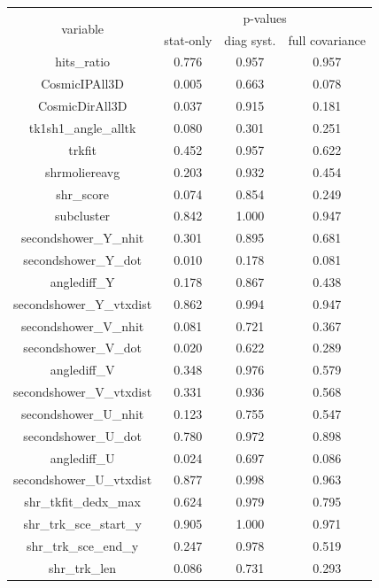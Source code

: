 \begin{table}[H]
\centering
\setlength{\tabcolsep}{10pt}
\renewcommand{\arraystretch}{1.25}
\begin{tabular}{| c | c | c | c | } 
 \hline
\multirow{2}{*}{variable} & \multicolumn{3}{c|}{p-values} \\
\cline{2-4} & stat-only & diag syst. & full covariance \\ \hline
hits\_ratio & 0.776 & 0.957 & 0.957 \\ \hline
CosmicIPAll3D & 0.005 & 0.663 & 0.078 \\ \hline
CosmicDirAll3D & 0.037 & 0.915 & 0.181 \\ \hline
tk1sh1\_angle\_alltk & 0.080 & 0.301 & 0.251 \\ \hline
trkfit & 0.452 & 0.957 & 0.622 \\ \hline
shrmoliereavg & 0.203 & 0.932 & 0.454 \\ \hline
shr\_score & 0.074 & 0.854 & 0.249 \\ \hline
subcluster & 0.842 & 1.000 & 0.947 \\ \hline
secondshower\_Y\_nhit & 0.301 & 0.895 & 0.681 \\ \hline
secondshower\_Y\_dot & 0.010 & 0.178 & 0.081 \\ \hline
anglediff\_Y & 0.178 & 0.867 & 0.438 \\ \hline
secondshower\_Y\_vtxdist & 0.862 & 0.994 & 0.947 \\ \hline
secondshower\_V\_nhit & 0.081 & 0.721 & 0.367 \\ \hline
secondshower\_V\_dot & 0.020 & 0.622 & 0.289 \\ \hline
anglediff\_V & 0.348 & 0.976 & 0.579 \\ \hline
secondshower\_V\_vtxdist & 0.331 & 0.936 & 0.568 \\ \hline
secondshower\_U\_nhit & 0.123 & 0.755 & 0.547 \\ \hline
secondshower\_U\_dot & 0.780 & 0.972 & 0.898 \\ \hline
anglediff\_U & 0.024 & 0.697 & 0.086 \\ \hline
secondshower\_U\_vtxdist & 0.877 & 0.998 & 0.963 \\ \hline
shr\_tkfit\_dedx\_max & 0.624 & 0.979 & 0.795 \\ \hline
shr\_trk\_sce\_start\_y & 0.905 & 1.000 & 0.971 \\ \hline
shr\_trk\_sce\_end\_y & 0.247 & 0.978 & 0.519 \\ \hline
shr\_trk\_len & 0.086 & 0.731 & 0.293 \\ \hline

\end{tabular}
\end{table}
